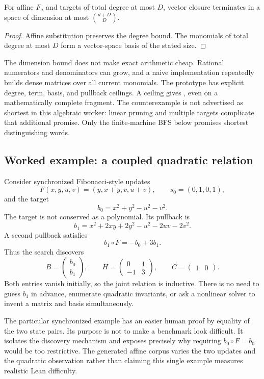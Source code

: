 \begin{corollary}
For affine $F_a$ and targets of total degree at most $D$, vector closure terminates in a space of dimension at most $\binom{d+D}{D}$.
\end{corollary}
\begin{proof}
Affine substitution preserves the degree bound. The monomials of total degree at most $D$ form a vector-space basis of the stated size.
\end{proof}

The dimension bound does not make exact arithmetic cheap. Rational numerators and denominators can grow, and a naive implementation repeatedly builds dense matrices over all current monomials. The prototype has explicit degree, term, basis, and pullback ceilings. A ceiling gives \unknown{}, even on a mathematically complete fragment. The counterexample is not advertised as shortest in this algebraic worker: linear pruning and multiple targets complicate that additional promise. Only the finite-machine BFS below promises shortest distinguishing words.

\subsection{Worked example: a coupled quadratic relation}

Consider synchronized Fibonacci-style updates
\[
 F(x,y,u,v)=(y,x+y,v,u+v),\qquad s_0=(0,1,0,1),
\]
and the target
\[
 b_0=x^2+y^2-u^2-v^2.
\]
The target is not conserved as a polynomial. Its pullback is
\[
 b_1=x^2+2xy+2y^2-u^2-2uv-2v^2.
\]
A second pullback satisfies
\[
 b_1\circ F=-b_0+3b_1.
\]
Thus the search discovers
\begin{equation}
 B=\begin{pmatrix}b_0\\b_1\end{pmatrix},\qquad
 H=\begin{pmatrix}0&1\\-1&3\end{pmatrix},\qquad C=\begin{pmatrix}1&0\end{pmatrix}.
 \label{eq:coupled-example}
\end{equation}
Both entries vanish initially, so the joint relation is inductive. There is no need to guess $b_1$ in advance, enumerate quadratic invariants, or ask a nonlinear solver to invent a matrix and basis simultaneously.

The particular synchronized example has an easier human proof by equality of the two state pairs. Its purpose is not to make a benchmark look difficult. It isolates the discovery mechanism and exposes precisely why requiring $b_0\circ F=b_0$ would be too restrictive. The generated affine corpus varies the two updates and the quadratic observation rather than claiming this single example measures realistic Lean difficulty.

